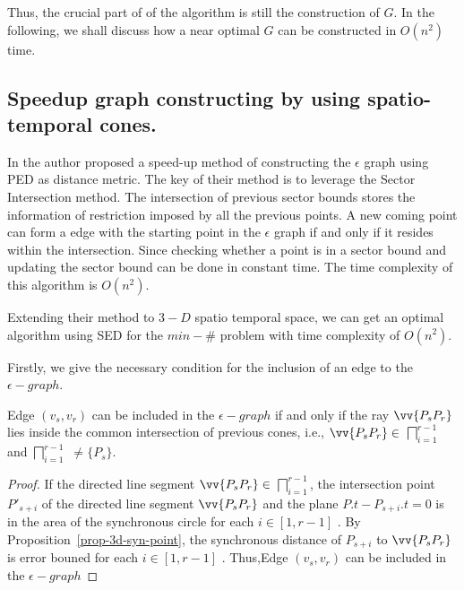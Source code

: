 Thus, the crucial part of of the algorithm is still the construction of $G$. 
In the following, we shall discuss how a near optimal $G$ can be constructed in $O(n^2)$ time.


\subsection{Speedup graph constructing by using spatio-temporal cones.}
In \cite{Chan:Optimal} the author proposed a speed-up method of constructing the
$\epsilon$ graph using PED as distance metric.
The key of their method is to leverage the Sector Intersection method.
The intersection of previous sector bounds stores the information of restriction
imposed by all the previous points. 
A new coming point can form a edge with the starting point in the $\epsilon$
graph if and only if it resides within the intersection.
Since checking whether a point is in a sector bound and updating the sector bound can be done in
constant time. The time complexity of this algorithm is $O(n^2)$.

Extending their method to $3-D$ spatio temporal space, we can get an optimal
algorithm using SED for the $min-\#$ problem with time complexity of $O(n^2)$.


Firstly, we give the necessary condition for the inclusion of an edge to the $\epsilon - graph$.

\begin{prop}
\label{prop-edge-check}
Edge $(v_s,v_r)$ can be included in the $\epsilon - graph$ if and only if the ray
$\vv{P_sP_r}$ lies inside the common intersection of previous cones, i.e.,
$\vv{P_sP_r} \in $ $\bigsqcap_{i=1}^{r - 1}$  and
$\bigsqcap_{i=1}^{r - 1}$ $\ne \{P_s\}$. 
\end{prop}

\begin{proof}
If the directed line segment $\vv{P_sP_r} \in$ $\bigsqcap_{i=1}^{r-1}$, the
intersection point $P'_{s+i}$ of the directed line segment $\vv{P_sP_r}$ and the
plane $P.t - P_{s+i}.t = 0$  is  in the area of the  synchronous circle
 for each $i \in [1,r - 1]$ . By Proposition~\ref{prop-3d-syn-point}, the
synchronous distance of $P_{s+i}$ to $\vv{P_sP_r}$ is error bouned for each $i \in [1,r - 1]$ . Thus,Edge
$(v_s,v_r)$ can be included in the $\epsilon - graph$  
\end{proof}


